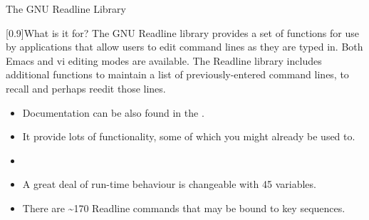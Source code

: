 
\begin{frame}{The GNU Readline Library}{}
    \vspace{-3mm}
    \begin{varblock}{}[0.9\textwidth]{What is it for?}
        The GNU Readline library provides a set of functions for use by applications that \alert{allow users to edit command lines as they are typed in}.
        Both Emacs and vi editing modes are available.
        The Readline library includes additional functions to maintain a list of previously-entered command lines, to recall and perhaps reedit those lines.
    \end{varblock}
    \vspace{2mm}
    \begin{itemize}[<2>]
        \setlength{\itemsep}{2mm}
        \item Documentation can be also found in the .
        \item It provide lots of functionality, some of which you might already be used to.
        \item {}
        \item A great deal of run-time behaviour is changeable with \alert{45 variables}. 
        \item There are \alert{\textasciitilde170 Readline commands} that may be bound to key sequences. 
    \end{itemize}
\end{frame}
